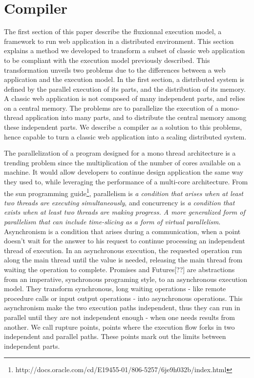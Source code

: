 \section{Compiler} \label{section:compiler}

The first section of this paper describe the fluxionnal execution model, a framework to run web application in a distributed environment.
This section explains a method we developed to transform a subset of classic web application to be compliant with the execution model previously described.
This transformation unveils two problems due to the differences between a web application and the execution model.
In the first section, a distributed system is defined by the parallel execution of its parts, and the distribution of its memory.
A classic web application is not composed of many independent parts, and relies on a central memory.
The problems are to parallelize the execution of a mono-thread application into many parts, and to distribute the central memory among these independent parts.
We describe a compiler as a solution to this problems, hence capable to turn a classic web application into a scaling distributed system. 

The parallelization of a program designed for a mono thread architecture is a trending problem since the multiplication of the number of cores available on a machine.
It would allow developers to continue design application the same way they used to, while leveraging the performance of a multi-core architecture.
From the sun programming guide\footnote{http://docs.oracle.com/cd/E19455-01/806-5257/6je9h032b/index.html}, parallelism is \textit{a condition that arises when at least two threads are executing simultaneously}, and concurrency is \textit{a condition that exists when at least two threads are making progress. A more generalized form of parallelism that can include time-slicing as a form of virtual parallelism}.
Asynchronism is a condition that arises during a communication, when a point doesn't wait for the answer to his request to continue processing an independent thread of execution.
In an asynchronous execution, the requested operation run along the main thread until the value is needed, releasing the main thread from waiting the operation to complete.
Promises\cite{Liskov1988} and Futures[??] are abstractions from an imperative, synchronous programing style, to an asynchronous execution model.
They transform synchronous, long waiting operations - like remote procedure calls or input output operations - into asynchronous operations.
This asynchronism make the two execution paths independent, thus they can run in parallel until they are not independent enough - when one needs results from another.
We call rupture points, points where the execution flow forks in two independent and parallel paths.
These points mark out the limits between independent parts.

